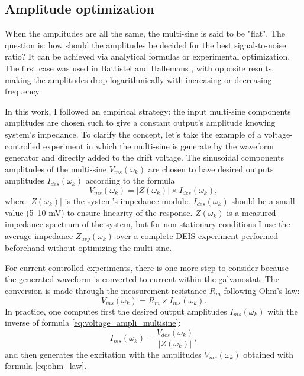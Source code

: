 \subsection{Amplitude optimization}
\label{sec:amplitude optim}
When the amplitudes are all the same, the multi-sine is said to be "flat". The question is: how should the amplitudes be decided for the best signal-to-noise ratio? It can be achieved via analytical formulas or experimental optimization.
The first case was used in Battistel \cite{battistelAnalysisNonstationaryImpedance2016} and Hallemans \cite{hallemansElectrochemicalImpedanceSpectroscopy2023}, with opposite results, making the amplitudes drop logarithmically with increasing or decreasing frequency.

In this work, I followed an empirical strategy: the input multi-sine components amplitudes are chosen such to give a constant output's amplitude knowing system's impedance.
To clarify the concept, let's take the example of a voltage-controlled experiment in which the multi-sine is generate by the waveform generator and directly added to the drift voltage.
The sinusoidal components amplitudes of the multi-sine $V_{ms}(\omega_k)$ are chosen to have desired outputs amplitudes $I_{des}(\omega_k)$ according to the formula
\begin{equation}
V_{ms}(\omega_k) = |Z(\omega_k)| \times I_{des}(\omega_k),
\label{eq:voltage_ampli_multisine}
\end{equation}
where $|Z(\omega_k)|$ is the system's impedance module.
$I_{des}(\omega_k)$ should be a small value (5--10 mV) to ensure linearity of the response.
$Z(\omega_k)$ is a measured impedance spectrum of the system, but for non-stationary conditions I use the average impedance $Z_{avg}(\omega_k)$ over a complete DEIS experiment performed beforehand without optimizing the multi-sine.

For current-controlled experiments, there is one more step to consider because the generated waveform is converted to current within the galvanostat.
The conversion is made through the measurement resistance $R_m$ following Ohm's law:
\begin{equation}
V_{ms}(\omega_k) = R_m \times I_{ms}(\omega_k).
\label{eq:ohm_law}
\end{equation}
In practice, one computes first the desired output amplitudes $I_{ms}(\omega_k)$ with the inverse of formula \ref{eq:voltage_ampli_multisine}:
\begin{equation}
I_{ms}(\omega_k) = \frac{V_{des}(\omega_k)}{|Z(\omega_k)|},
\end{equation}
and then generates the excitation with the amplitudes $V_{ms}(\omega_k)$ obtained with formula \ref{eq:ohm_law}.

